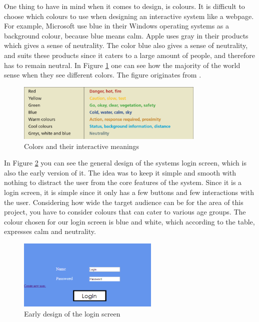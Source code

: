 One thing to have in mind when it comes to design, is colours. It is difficult to choose which colours to use when designing an interactive system like a webpage. For example, Microsoft use blue in their Windows operating systems as a background colour, because blue means calm. Apple uses gray in their products which gives a sense of neutrality. The color blue also gives a sense of neutrality, and suits these products since it caters to a large amount of people, and therefore has to remain neutral. In Figure \ref{Colors} one can see how the majority of the world sense when they see different colors. The figure originates from \cite{DEBBook}.

\begin{figure}[htb]
\centering
\includegraphics[width=0.8\textwidth]{Images/Colors.png}
\caption{Colors and their interactive meanings}
\label{Colors}
\end{figure}

In Figure \ref{Login} you can see the general design of the systems login screen, which is also the early version of it. The idea was to keep it simple and smooth with nothing to distract the user from the core features of the system. Since it is a login screen, it is simple since it only has a few buttons and few interactions with the user. Considering how wide the target audience can be for the area of this project, you have to consider colours that can cater to various age groups. The colour chosen for our login screen is blue and white, which according to the table, expresses calm and neutrality.

\begin{figure}[htb]
\centering
\includegraphics[width=0.6\textwidth]{Images/Login.png}
\caption{Early design of the login screen}
\label{Login}
\end{figure}

